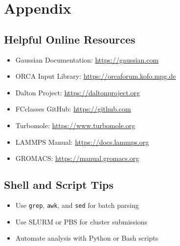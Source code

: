 
\chapter*{Appendix}

\section*{Helpful Online Resources}

\begin{itemize}
    \item Gaussian Documentation: \url{https://gaussian.com}
    \item ORCA Input Library: \url{https://orcaforum.kofo.mpg.de}
    \item Dalton Project: \url{https://daltonproject.org}
    \item FCclasses GitHub: \url{https://github.com}
    \item Turbomole: \url{https://www.turbomole.org}
    \item LAMMPS Manual: \url{https://docs.lammps.org}
    \item GROMACS: \url{https://manual.gromacs.org}
\end{itemize}

\section*{Shell and Script Tips}

\begin{itemize}
    \item Use \texttt{grep}, \texttt{awk}, and \texttt{sed} for batch parsing
    \item Use SLURM or PBS for cluster submissions
    \item Automate analysis with Python or Bash scripts
\end{itemize}
